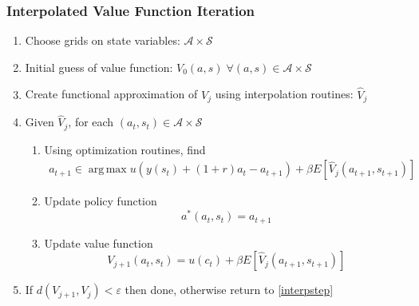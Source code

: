 \documentclass[10pt]{beamer}
\DeclareMathOperator*{\argmax}{arg\,max}
\begin{document}
\begin{frame} \frametitle{Interpolated Value Function Iteration}

  \begin{enumerate}
    \item Choose grids on state variables: $\mathcal{A} \times \mathcal{S}$
    \item Initial guess of value function: $V_0(a, s) \;\forall (a, s) \in \mathcal{A} \times \mathcal{S}$
    \item Create functional approximation of $V_j$ using interpolation routines: $\hat{V}_j$ \label{interpstep}
    \item Given $\hat{V}_j$, for each $(a_t, s_t) \in \mathcal{A} \times \mathcal{S}$
      \begin{enumerate}
        \item Using optimization routines, find
          \begin{align*}
            a_{t+1} \in \argmax u(y(s_t) + (1+r) a_t - a_{t+1}) + \beta E \left[ \hat{V}_j(a_{t+1}, s_{t+1}) \right]
          \end{align*}
        \item Update policy function $$a^*(a_t, s_t) = a_{t+1}$$
        \item Update value function $$V_{j+1}(a_t, s_t) = u(c_t) + \beta E \left[\hat{V}_{j}(a_{t+1}, s_{t+1}) \right]$$
      \end{enumerate}
    \item If $d(V_{j+1}, V_j) < \varepsilon$ then done, otherwise return to \ref{interpstep}
  \end{enumerate}

\end{frame}
\end{document}
